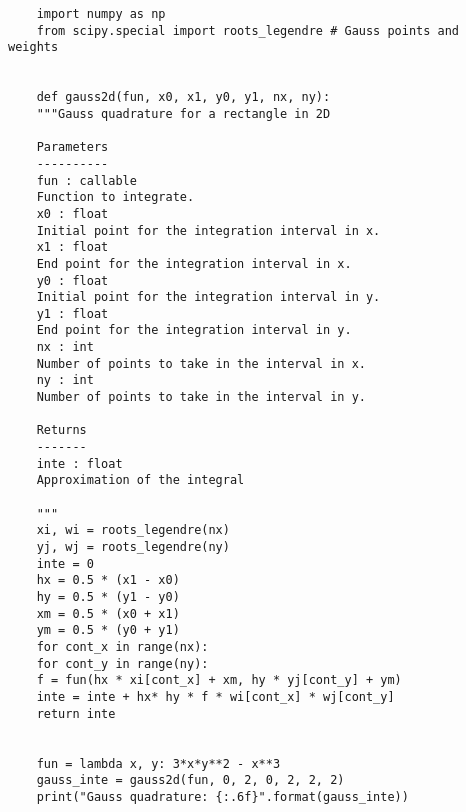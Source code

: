 \begin{mdframed}[linecolor=black,
	topline=true,
	bottomline=true,
	leftline=false,
	rightline=false]
	\begin{verbatim}
	import numpy as np
	from scipy.special import roots_legendre # Gauss points and weights
	
	
	def gauss2d(fun, x0, x1, y0, y1, nx, ny):
	"""Gauss quadrature for a rectangle in 2D
	
	Parameters
	----------
	fun : callable
	Function to integrate.
	x0 : float
	Initial point for the integration interval in x.
	x1 : float
	End point for the integration interval in x.
	y0 : float
	Initial point for the integration interval in y.
	y1 : float
	End point for the integration interval in y.
	nx : int
	Number of points to take in the interval in x.
	ny : int
	Number of points to take in the interval in y.
	
	Returns
	-------
	inte : float
	Approximation of the integral
	
	"""
	xi, wi = roots_legendre(nx)
	yj, wj = roots_legendre(ny)
	inte = 0
	hx = 0.5 * (x1 - x0)
	hy = 0.5 * (y1 - y0)
	xm = 0.5 * (x0 + x1)
	ym = 0.5 * (y0 + y1)
	for cont_x in range(nx):
	for cont_y in range(ny):
	f = fun(hx * xi[cont_x] + xm, hy * yj[cont_y] + ym)
	inte = inte + hx* hy * f * wi[cont_x] * wj[cont_y]
	return inte
	
	
	fun = lambda x, y: 3*x*y**2 - x**3
	gauss_inte = gauss2d(fun, 0, 2, 0, 2, 2, 2)
	print("Gauss quadrature: {:.6f}".format(gauss_inte))
	\end{verbatim}
\end{mdframed}






